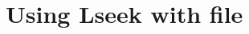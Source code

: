 \documentclass{article}
\begin{document}
	\section{Using Lseek with file}\label{sec:sec1}
	\paragraph{}
\end{document}
